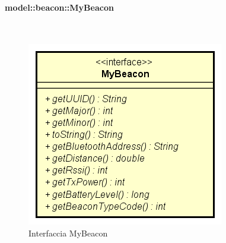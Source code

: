\documentclass[../DefinizioneDiProdotto.tex]{subfiles}
\begin{document}
\paragraph{model::beacon::MyBeacon}
\
\begin{figure}[H]
	\centering
	\includegraphics[width=\maxwidth]{img/MyBeacon.png}
	\caption{Interfaccia MyBeacon}\label{fig:model::beacon::MyBeacon} 
\end{figure}
\end{document}
